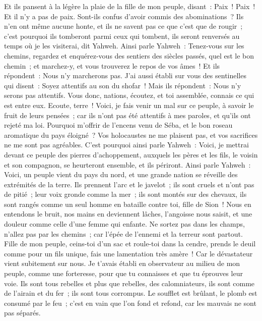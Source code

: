 \begin{multicols}{2}
Et ils pansent à la légère la plaie de la fille de mon peuple, disant~: Paix~! Paix~! Et il n'y a pas de paix.
Sont-ils confus d'avoir commis des abominations~? Ils n'en ont même aucune honte, et ils ne savent pas ce que c'est que de rougir~; c'est pourquoi ils tomberont parmi ceux qui tombent, ils seront renversés au temps où je les visiterai, dit Yahweh.
Ainsi parle Yahweh~: Tenez-vous sur les chemins, regardez et enquérez-vous des sentiers des siècles passés, quel est le bon chemin~; et marchez-y, et vous trouverez le repos de vos âmes~! Et ils répondent~: Nous n'y marcherons pas.
J'ai aussi établi sur vous des sentinelles qui disent~: Soyez attentifs au son du shofar~! Mais ils répondent~: Nous n'y serons pas attentifs.
Vous donc, nations, écoutez, et toi assemblée, connais ce qui est entre eux.
Ecoute, terre~! Voici, je fais venir un mal sur ce peuple, à savoir le fruit de leurs pensées~; car ils n'ont pas été attentifs à mes paroles, et qu'ils ont rejeté ma loi.
Pourquoi m'offrir de l'encens venu de Séba, et le bon roseau aromatique du pays éloigné~? Vos holocaustes ne me plaisent pas, et vos sacrifices ne me sont pas agréables.
C'est pourquoi ainsi parle Yahweh~: Voici, je mettrai devant ce peuple des pierres d'achoppement, auxquels les pères et les fils, le voisin et son compagnon, se heurteront ensemble, et ils périront.
Ainsi parle Yahweh~: Voici, un peuple vient du pays du nord, et une grande nation se réveille des extrémités de la terre.
Ils prennent l'arc et le javelot~; ils sont cruels et n'ont pas de pitié~; leur voix gronde comme la mer~; ils sont montés sur des chevaux, ils sont rangés comme un seul homme en bataille contre toi, fille de Sion~!
Nous en entendons le bruit, nos mains en deviennent lâches, l'angoisse nous saisit, et une douleur comme celle d'une femme qui enfante.
Ne sortez pas dans les champs, n'allez pas par les chemins~; car l'épée de l'ennemi et la terreur sont partout.
Fille de mon peuple, ceins-toi d'un sac et roule-toi dans la cendre, prends le deuil comme pour un fils unique, fais une lamentation très amère~! Car le dévastateur vient subitement sur nous.
Je t'avais établi en observateur au milieu de mon peuple, comme une forteresse, pour que tu connaisses et que tu éprouves leur voie.
Ils sont tous rebelles et plus que rebelles, des calomniateurs, ils sont comme de l'airain et du fer~; ils sont tous corrompus.
Le soufflet est brûlant, le plomb est consumé par le feu~; c'est en vain que l'on fond et refond, car les mauvais ne sont pas séparés.

\end{multicols}
